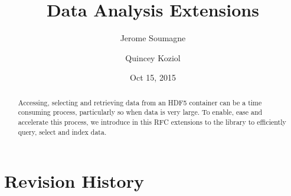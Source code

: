 \documentclass[letterpaper,hyper]{THG_RFC}
\title{Data Analysis Extensions}
\author{Jerome Soumagne}
\author{Quincey Koziol}
\date{Oct 15, 2015}
\begin{document}
\maketitle

\begin{abstract}
Accessing, selecting and retrieving data from an HDF5 container can be a time
consuming process, particularly so when data is very large. To enable, ease and 
accelerate this process, we introduce in this RFC extensions to the library
to efficiently query, select and index data.
\end{abstract}



\section*{Revision History}
\makerevisions



\end{document}
